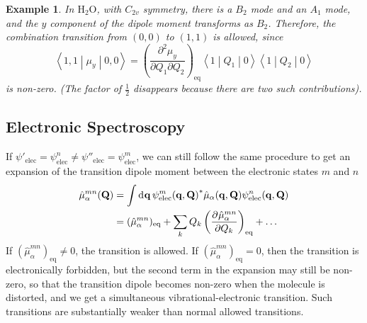 \documentclass{article}
\theoremstyle{plain}\theoremheaderfont{\normalfont\itshape}\theorembodyfont{\rmfamily}\theoremseparator{.}\newtheorem*{rem}{Remark}\newtheorem*{ex}{Example}\newtheorem*{proof}{Proof}\newtheorem*{altp}{Alternative proof}
\theoremstyle{plain}\theoremheaderfont{\normalfont\bfseries}\theorembodyfont{\rmfamily}\theoremseparator{.}\newtheorem{thm}{Theorem}[section]\newtheorem{lem}[thm]{Lemma}\newtheorem{prop}[thm]{Proposition}\newtheorem*{cor}{Corollary}\newtheorem{defn}[thm]{Definition}\newtheorem{clm}[thm]{Claim}\newtheorem{clminproof}{Claim}\newtheorem*{law}{Law}\newtheorem{pos}[thm]{Postulate}
\theoremstyle{break}\theoremheaderfont{\normalfont\itshape}\theorembodyfont{\rmfamily}\theoremseparator{.\medskip}\newtheorem*{proofskip}{Proof}\newtheorem*{exs}{Examples}\newtheorem*{rems}{Remarks}
\theoremstyle{break}\theoremheaderfont{\normalfont\bfseries}\theorembodyfont{\rmfamily}\theoremseparator{.\medskip}\newtheorem{lemskip}[thm]{Lemma}\newtheorem{defnskip}[thm]{Definition}\newtheorem{propskip}[thm]{Proposition}\newtheorem{thmskip}[thm]{Theorem}
\numberwithin{equation}{section}
\newcommand{\dd}[2][]{\mathrm{d}^{#1} #2\,}
\newcommand{\pdv}[3][]{\frac{\partial^{#1} #2}{{\partial #3}^{#1}}}
\newcommand{\mel}[3]{\left\langle #1 \middle| #2 \middle| #3 \right\rangle}
\newcommand{\vb}[1]{\bm{\mathrm{#1}}}
\begin{document}
    \begin{ex}
        In \(\mathrm{H_2O}\), with \(C_{2v}\) symmetry, there is a \(B_2\) mode and an \(A_1\) mode, and the \(y\) component of the dipole moment transforms as \(B_2\). Therefore, the combination transition from \((0,0)\) to \((1,1)\) is allowed, since
        \begin{equation}
            \mel{1,1}{\mu_y}{0,0}=\left(\frac{\partial^2 \mu_y}{\partial Q_1\partial Q_2}\right)_{\text{eq}}\mel{1}{Q_1}{0}\mel{1}{Q_2}{0}
        \end{equation}
        is non-zero. (The factor of \(\frac{1}{2}\) disappears because there are two such contributions).
    \end{ex}

    \subsection{Electronic Spectroscopy}
    If \(\psi'_{\text{elec}}=\psi^n_{\text{elec}}\ne\psi''_{\text{elec}}=\psi^m_{\text{elec}}\), we can still follow the same procedure to get an expansion of the transition dipole moment between the electronic states \(m\) and \(n\)
    \begin{align}
        \hat{\mu}_{\alpha}^{mn}(\vb{Q})&=\int\dd{\vb{q}}{\psi_{\text{elec}}^m(\vb{q},\vb{Q})}^*\hat{\mu}_\alpha(\vb{q},\vb{Q})\psi_{\text{elec}}^n(\vb{q},\vb{Q})\notag\\
        &=(\hat{\mu}_{\alpha}^{mn})_{\text{eq}}+\sum_k Q_k\left(\pdv{\hat{\mu}_\alpha^{mn}}{Q_k}\right)_{\text{eq}}+\dots
    \end{align}
    If \((\hat{\mu}_{\alpha}^{mn})_{\text{eq}}\ne 0\), the transition is allowed. If \((\hat{\mu}_{\alpha}^{mn})_{\text{eq}}=0\), then the transition is electronically forbidden, but the second term in the expansion may still be non-zero, so that the transition dipole becomes non-zero when the molecule is distorted, and we get a simultaneous vibrational-electronic transition. Such transitions are substantially weaker than normal allowed transitions.
\end{document}
